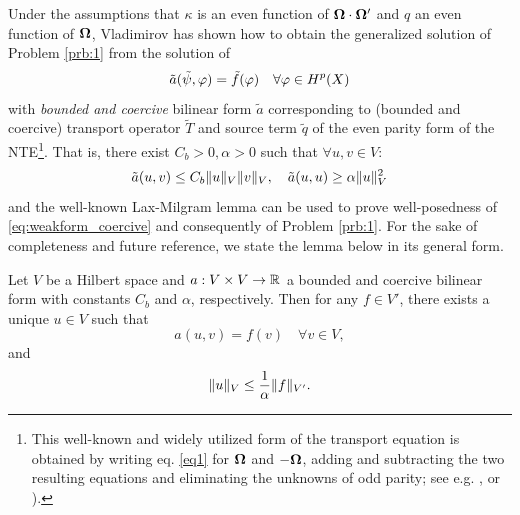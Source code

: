 Under the assumptions that $\kappa$ is an even function of $\bomega\cdot\bomega'$ and $q$ an even function of $\bomega$,
Vladimirov \cite{Vladimirov} has shown how to obtain the generalized solution of Problem \ref{prb:1} from the solution
of
\begin{equation}\label{eq:weakform_coercive}
	\tilde{a}(\tilde{\psi}, \varphi) = \tilde{f}(\varphi) \quad \forall \varphi\in \Hp(X)
\end{equation} 
with \textit{bounded and coercive} bilinear form $\tilde{a}$ corresponding to (bounded and coercive) transport operator
$\tilde{T}$ and source term $\tilde{q}$ of the even parity form of the NTE\footnote{This well-known and widely utilized
form of the transport equation is obtained by writing eq. \eqref{eq1} for $\bomega$ and $-\bomega$, adding and
subtracting the two resulting equations and eliminating the unknowns of odd parity; see e.g. \cite[Chap.
II]{Azmy1}, \cite[Sec. 9.11]{Stacey1} or \cite[Chap. XX]{DautrayLions}).}.
%
 That is, there exist $C_b > 0, \alpha > 0$ such that $\forall u,v \in V$:
$$
	\tilde{a}(u,v) \leq C_b \norm[{V}]{u}\norm[{V}]{v},
	\quad \tilde{a}(u, u) \geq \alpha \norm[{V}]{u}^2
$$
and the well-known Lax-Milgram lemma can be used to prove well-posedness of \eqref{eq:weakform_coercive} and
consequently of Problem \ref{prb:1}. For the sake of completeness and future reference, we state the lemma below in
its general form.
\begin{lemma}\label{lem:lax-milgram}
	Let $V$ be a Hilbert space and $a : V\times V \to \R$ a bounded and coercive bilinear form with constants $C_b$ and
	$\alpha$, respectively.
	Then for any $f \in V'$, there exists a unique $u\in V$ such that
	\begin{equation}\label{eq:laxmilgram}
		a(u,v) = f(v) \quad \forall v\in V,
	\end{equation}
	and
	$$
		\norm[V]{u} \leq \frac{1}{\alpha}\norm[V']{f}.
	$$
\end{lemma}



